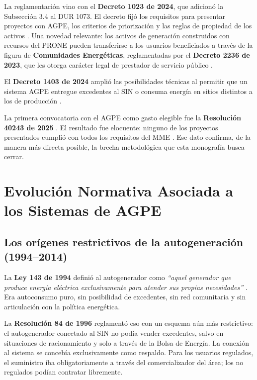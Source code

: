 La reglamentación vino con el \textbf{Decreto 1023 de 2024}, que adicionó la Subsección 3.4 al DUR 1073. El decreto fijó los requisitos para presentar proyectos con AGPE, los criterios de priorización y las reglas de propiedad de los activos \parencite{Decreto1023_2024}. Una novedad relevante: los activos de generación construidos con recursos del PRONE pueden transferirse a los usuarios beneficiados a través de la figura de \textbf{Comunidades Energéticas}, reglamentadas por el \textbf{Decreto 2236 de 2023}, que les otorga carácter legal de prestador de servicio público \parencite{Decreto2236_2023, DUR1073_2015}.

El \textbf{Decreto 1403 de 2024} amplió las posibilidades técnicas al permitir que un sistema AGPE entregue excedentes al SIN o consuma energía en sitios distintos a los de producción \parencite{Decreto1403_2024}.

La primera convocatoria con el AGPE como gasto elegible fue la \textbf{Resolución 40243 de 2025} \parencite{ResolucionMME40243_2025}. El resultado fue elocuente: ninguno de los proyectos presentados cumplió con todos los requisitos del MME \parencite{MME2025}. Ese dato confirma, de la manera más directa posible, la brecha metodológica que esta monografía busca cerrar.


\section{Evolución Normativa Asociada a los Sistemas de AGPE}
\label{sec:normativa_agpe}

\subsection{Los orígenes restrictivos de la autogeneración (1994--2014)}
\label{subsec:origenes_agpe}

La \textbf{Ley 143 de 1994} definió al autogenerador como \textit{``aquel generador que produce energía eléctrica exclusivamente para atender sus propias necesidades''} \parencite{Ley143_1994}. Era autoconsumo puro, sin posibilidad de excedentes, sin red comunitaria y sin articulación con la política energética.

La \textbf{Resolución 84 de 1996} reglamentó eso con un esquema aún más restrictivo: el autogenerador conectado al SIN no podía vender excedentes, salvo en situaciones de racionamiento y solo a través de la Bolsa de Energía. La conexión al sistema se concebía exclusivamente como respaldo. Para los usuarios regulados, el suministro iba obligatoriamente a través del comercializador del área; los no regulados podían contratar libremente.

